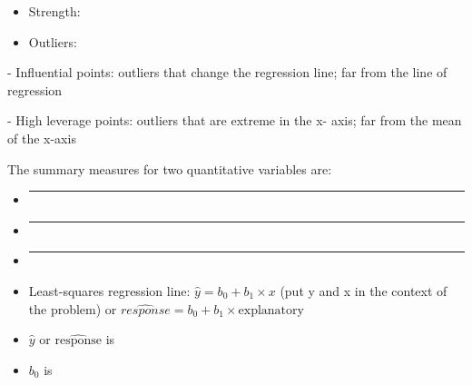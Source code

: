 \documentclass[
]{report}
\providecommand{\tightlist}{%
  \setlength{\itemsep}{0pt}\setlength{\parskip}{0pt}}
\newcommand{\rgi}{\hspace{24pt}}  %
\begin{document}
\vspace{0.2in}

\begin{itemize}
\tightlist
\item
  Strength:
\end{itemize}

\vspace{0.2in}

\begin{itemize}
\tightlist
\item
  Outliers:
\end{itemize}

\vspace{0.2in}

\rgi \rgi - Influential points: outliers that change the regression line; far from the line of regression

\rgi \rgi - High leverage points: outliers that are extreme in the x- axis; far from the mean of the x-axis


The summary measures for two quantitative variables are:

\begin{itemize}
\item
  \begin{center}\rule{0.5\linewidth}{0.5pt}\end{center}
\item
  \begin{center}\rule{0.5\linewidth}{0.5pt}\end{center}
\item
  \begin{center}\rule{0.5\linewidth}{0.5pt}\end{center}
\end{itemize}


\begin{itemize}
\item
  Least-squares regression line: \(\hat{y}=b_0+b_1\times x\) (put y and x in the context of the problem) or \(\widehat{response}=b_0+b_1 \times \text{explanatory}\)
\item
  \(\hat{y}\) or \(\widehat{\text{response}}\) is
\end{itemize}

\vspace{0.1in}

\begin{itemize}
\tightlist
\item
  \(b_0\) is
\end{itemize}
\end{document}

